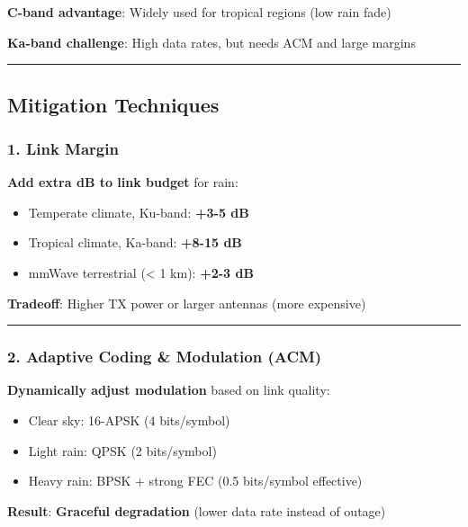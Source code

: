 \textbf{C-band advantage}: Widely used for tropical regions (low rain
fade)

\textbf{Ka-band challenge}: High data rates, but needs ACM and large
margins

\begin{center}\rule{0.5\linewidth}{0.5pt}\end{center}

\subsection{Mitigation Techniques}\label{mitigation-techniques}

\subsubsection{1. Link Margin}\label{link-margin}

\textbf{Add extra dB to link budget} for rain:

\begin{itemize}
\tightlist
\item
  Temperate climate, Ku-band: \textbf{+3-5 dB}
\item
  Tropical climate, Ka-band: \textbf{+8-15 dB}
\item
  mmWave terrestrial (\textless{} 1 km): \textbf{+2-3 dB}
\end{itemize}

\textbf{Tradeoff}: Higher TX power or larger antennas (more expensive)

\begin{center}\rule{0.5\linewidth}{0.5pt}\end{center}

\subsubsection{2. Adaptive Coding \& Modulation
(ACM)}\label{adaptive-coding-modulation-acm}

\textbf{Dynamically adjust modulation} based on link quality:

\begin{itemize}
\tightlist
\item
  Clear sky: 16-APSK (4 bits/symbol)
\item
  Light rain: QPSK (2 bits/symbol)
\item
  Heavy rain: BPSK + strong FEC (0.5 bits/symbol effective)
\end{itemize}

\textbf{Result}: \textbf{Graceful degradation} (lower data rate instead
of outage)

